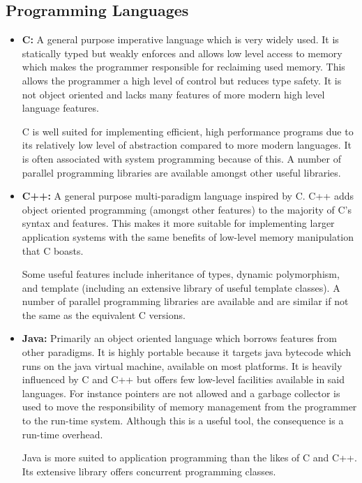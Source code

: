 \subsection*{Programming Languages}

\begin{itemize}
\item \textbf{C:} 
            A general purpose imperative language which is very widely used.
            It is statically typed but weakly enforces and allows low level access to memory which 
            makes the programmer responsible for reclaiming used memory.
            This allows the programmer a high level of control but reduces type safety.
            It is not object oriented and lacks many features of more modern high level
            language features.
            
            C is well suited for implementing efficient, high performance programs due to
            its relatively low level of abstraction compared to more modern languages.
            It is often associated with system programming because of this.
            A number of parallel programming libraries are available amongst other useful 
            libraries.

\item \textbf{C++:}
            A general purpose multi-paradigm language inspired by C.
            C++ adds object oriented programming (amongst other features) to the majority 
            of C's syntax and features. 
            This makes it more suitable for implementing larger application systems 
            with the same benefits of low-level memory manipulation that C boasts.
            
            Some useful features include inheritance of types, dynamic polymorphism, 
            and template (including an extensive library of useful template classes).
            A number of parallel programming libraries are available and are similar 
            if not the same as the equivalent C versions.
            
\item \textbf{Java:}
            Primarily an object oriented language which borrows features from other paradigms.
            It is highly portable because it targets java bytecode which runs on the java virtual machine, available on most platforms.
            It is heavily influenced by C and C++ but offers few low-level facilities available in said languages. 
            For instance pointers are not allowed and a garbage collector is used to move
            the responsibility of memory management from the programmer to the run-time system.
            Although this is a useful tool, the consequence is a run-time overhead.
            
            Java is more suited to application programming than the likes of C and C++.
            Its extensive library offers concurrent programming classes.
            
\end{itemize}

